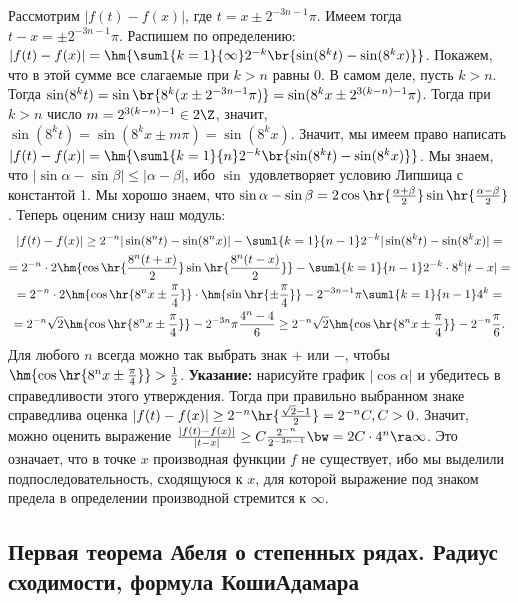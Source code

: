 \documentclass[a4paper]{article}
\begin{document}
Рассмотрим $|f(t)-f(x)|$, где $t=x \pm 2^{-3n-1}\pi$. Имеем тогда $t-x=\pm 2^{-3n-1}\pi$. Распишем по определению:
$|f(t)-f(x)|=\hm{\suml{k=1}{\infty} 2^{-k}\br{\sin (8^kt)-\sin(8^kx)}} $. Покажем, что в этой сумме все слагаемые при $k>n$ равны 0.
В самом деле, пусть $k>n$. Тогда $\sin(8^kt)=\sin\br{8^k(x \pm 2^{-3n-1}\pi)}=\sin(8^k x \pm 2^{3(k-n)-1}\pi)$. Тогда при
$k>n$ число $m=2^{3(k-n)-1} \in 2\Z$, значит, $\sin(8^kt)=\sin(8^kx\pm m\pi)=\sin(8^kx)$. Значит, мы имеем право написать
$|f(t)-f(x)|=\hm{\suml{k=1}{n} 2^{-k}\br{\sin (8^kt)-\sin(8^kx)}} $. Мы знаем, что $|\sin \alpha - \sin \beta| \le |\alpha - \beta|$,
ибо $\sin$ удовлетворяет условию Липшица с константой 1. Мы хорошо знаем, что $\sin \alpha - \sin \beta =
2\cos\hr{ \frac{\alpha+\beta}{2}} \sin\hr{ \frac{\alpha-\beta}{2}} $. Теперь оценим снизу наш модуль:
\begin{multline*}
|f(t)-f(x)| \ge 2^{-n}|\sin (8^nt)-\sin(8^nx)| - \suml{k=1}{n-1}2^{-k}|\sin (8^kt)-\sin(8^kx)|=\\
=2^{-n} \cdot 2\hm{\cos\hr{ \frac{8^n(t+x)}{2}} \sin\hr{ \frac{8^n(t-x)}{2}}} - \suml{k=1}{n-1} 2^{-k}\cdot 8^k|t-x|=\\
=2^{-n} \cdot 2\hm{\cos\hr{ 8^nx\pm \frac{\pi}{4}}} \cdot\hm{\sin\hr{ \pm \frac{\pi}{4}}} - 2^{-3n-1}\pi\suml{k=1}{n-1} 4^k=\\
=2^{-n} \sqrt{2}\hm{\cos\hr{ 8^nx\pm \frac{\pi}{4}}} - 2^{-3n}\pi\frac{4^n-4}{6} \ge
2^{-n} \sqrt{2}\hm{\cos\hr{ 8^nx\pm \frac{\pi}{4}}} - 2^{-n}\frac{\pi}{6}.
\end{multline*}
Для любого $n$ всегда можно так выбрать знак $+$ или $-$, чтобы $\hm{\cos\hr{ 8^nx \pm \frac{\pi}{4}}} > \frac{1}{2}$.
\textbf{Указание:} нарисуйте график $|\cos \alpha|$ и убедитесь в справедливости этого утверждения.
Тогда при правильно выбранном знаке справедлива оценка
$|f(t)-f(x)| \ge 2^{-n}\hr{ \frac{\sqrt{2}-1}{2}} = 2^{-n}C, C > 0$. Значит, можно оценить выражение
$\frac{|f(t)-f(x)|}{|t-x|} \ge C\frac{2^{-n}}{2^{-3n-1}}\bw=2C \cdot 4^n \ra \infty$. Это означает, что
в точке $x$ производная функции $f$ не существует, ибо мы выделили подпоследовательность, сходящуюся к $x$, для
которой выражение под знаком предела в определении производной стремится к $\infty$.

\subsection{Первая теорема Абеля о степенных рядах. Радиус сходимости, формула Коши\ч Адамара}
\end{document}
